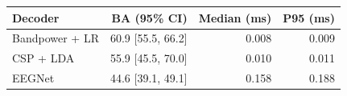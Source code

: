 \begin{tabular}{lrrr}
\toprule
Decoder & BA (95\% CI) & Median (ms) & P95 (ms) \\
\midrule
Bandpower + LR & 60.9 [55.5, 66.2] & 0.008 & 0.009 \\
CSP + LDA & 55.9 [45.5, 70.0] & 0.010 & 0.011 \\
EEGNet & 44.6 [39.1, 49.1] & 0.158 & 0.188 \\
\bottomrule
\end{tabular}
